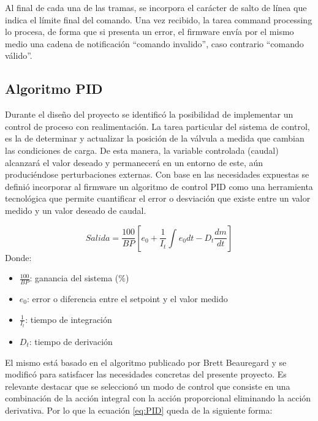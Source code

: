 Al final de cada una de las tramas, se incorpora el carácter de salto de línea que indica el límite final del comando. Una vez recibido, la tarea command processing lo procesa, de forma que si presenta un error, el firmware envía por el mismo medio una cadena de notificación “comando invalido”, caso contrario “comando válido”. 

\subsection{Algoritmo PID}
\label{subsec:Algoritmo PID}

Durante el diseño del proyecto se identificó la posibilidad de implementar un control de proceso con realimentación. La tarea particular del sistema de control, es la de determinar y actualizar la posición de la válvula a medida que cambian las condiciones de carga. De esta manera, la variable controlada (caudal) alcanzará el valor deseado y permanecerá en un entorno de este, aún produciéndose perturbaciones externas. Con base en las necesidades expuestas se definió incorporar al firmware un algoritmo de control PID como una herramienta tecnológica que permite cuantificar el error o desviación que existe entre un valor medido y un valor deseado de caudal. 

\begin{equation}
 \label{eq:PID}
Salida =  \frac{100}{BP} [e_{0}+ \frac{1}{I_{t}} \int_{}^{} e_{0} dt - D_{t} \frac{dm}{dt}]
\end{equation}
Donde:\\ 
\begin{itemize}


\item $\frac{100}{BP}$: ganancia del sistema (\%) 
\item ${e_{0}}$:  error o diferencia entre el setpoint y el valor medido 
\item $\frac{1}{I_{t}}$: tiempo de integración
\item ${D_{t}}$: tiempo de derivación


\end{itemize}


El mismo está basado en el algoritmo publicado por Brett Beauregard \citep{ALGORITMOPID} y se modificó para satisfacer las necesidades concretas del presente proyecto. Es relevante destacar que se seleccionó un modo de control que consiste en una combinación de la acción integral con la acción proporcional eliminando la acción derivativa. Por lo que la ecuación \ref{eq:PID} queda de la siguiente forma:
   
